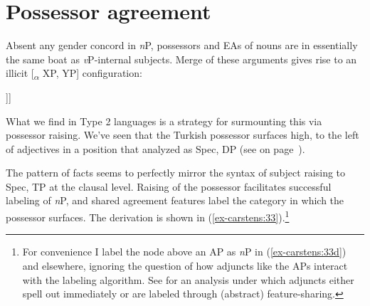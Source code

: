 \documentclass[output=paper
,modfonts
,nonflat]{langsci/langscibook}
\begin{document}
\section{Possessor agreement} \label{sec-carstens:4}
Absent any gender concord in \textit{n}P, possessors and EAs of nouns are in essentially the same boat as \textit{v}P-internal subjects. Merge of these arguments gives rise to an illicit [\textsubscript{${\alpha}$} XP, YP] configuration:

\begin{exe}
\ex *[\textsubscript{$\alpha$} [\textsubscript{XP} possessor] [\textsubscript{YP} \textit{n} [possessed]]]
\end{exe}
What we find in Type 2 languages is a strategy for surmounting this via possessor raising. We’ve seen that the Turkish possessor surfaces high, to the left of adjectives in a position that \citet{Abney1987} analyzed as Spec, DP (see  on page~\pageref{ex-carstens:19}).%

The pattern of facts seems to perfectly mirror the syntax of subject raising to Spec, TP at the clausal level. Raising of the possessor facilitates successful labeling of \textit{n}P, and shared agreement features label the category in which the possessor surfaces. The derivation is shown in (\ref{ex-carstens:33}).\footnote{For convenience I label the node above an AP as \textit{n}P in (\ref{ex-carstens:33d}) and elsewhere, ignoring the question of how adjuncts like the APs interact with the labeling algorithm. See \citet{Oseki2014} for an analysis under which adjuncts either spell out immediately or are labeled through (abstract) feature-sharing.}
\end{document}
